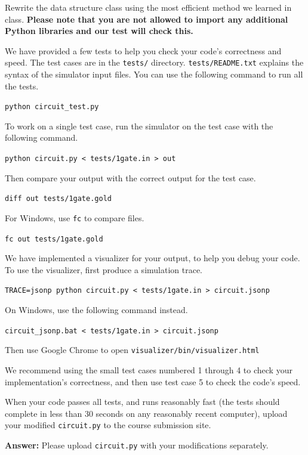 \documentclass[12pt,twoside]{article}
\newcommand{\answer}{
 \par\medskip
 \textbf{Answer:}
}
\begin{document}
\begin{problems}
\begin{problemparts}
\problempart {} Rewrite the data structure class using the most
efficient method we learned in class. \textbf{Please note that you are not
allowed to import any additional Python libraries and our test will check this.}

We have provided a few tests to help you check your code's correctness and
speed. The test cases are in the \texttt{tests/} directory.
\texttt{tests/README.txt} explains the syntax of the simulator input files. You
can use the following command to run all the tests.

\texttt{python circuit\_test.py}

To work on a single test case, run the simulator on the test case with the
following command.

\texttt{python circuit.py < tests/1gate.in > out}

Then compare your output with the correct output for the test case.

\texttt{diff out tests/1gate.gold}

For Windows, use \texttt{fc} to compare files.

\texttt{fc out tests/1gate.gold}

We have implemented a visualizer for your output, to help you debug your code.
To use the visualizer, first produce a simulation trace.

\texttt{TRACE=jsonp python circuit.py < tests/1gate.in > circuit.jsonp}

On Windows, use the following command instead.

\texttt{circuit\_jsonp.bat < tests/1gate.in > circuit.jsonp}

Then use Google Chrome to open
\texttt{visualizer/bin/visualizer.html}

We recommend using the small test cases numbered 1 through 4 to check your
implementation's correctness, and then use test case 5 to check the code's
speed.

When your code passes all tests, and runs reasonably fast (the tests should
complete in less than 30 seconds on any reasonably recent computer), upload your
modified \texttt{circuit.py} to the course submission site.

\answer {
  Please upload \texttt{circuit.py} with your modifications separately.
}

\end{problemparts}

\end{problems}
\end{document}
